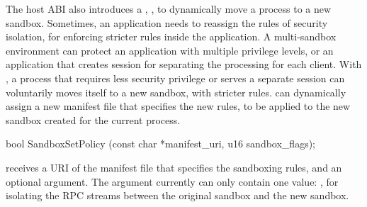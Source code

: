 The host ABI also introduces a \hostapi{}, ,
to dynamically move a process to a new sandbox.
Sometimes, an application needs to reassign the rules of security isolation,
for enforcing stricter rules inside the application.
A multi-sandbox environment can protect an application with multiple privilege levels, or an application that creates session for separating the processing for each client.
With , a process that requires less security privilege
or serves a separate session can voluntarily moves itself to a new sandbox,
with stricter rules.
 can dynamically
assign a new manifest file that specifies the new rules,
to be applied to the
new sandbox created for the current process.







\begin{paldef}
bool SandboxSetPolicy (const char *manifest_uri,
                       u16 sandbox_flags);
\end{paldef}


 receives a URI of the manifest file that specifies the sandboxing rules,
and an optional  argument.
The  argument currently can only contain one value:
, for isolating the RPC streams between the original sandbox and the new sandbox.
